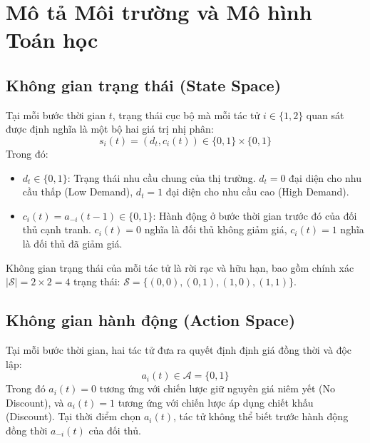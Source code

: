 \documentclass[12pt,a4paper]{article}
\begin{document}
\section{Mô tả Môi trường và Mô hình Toán học}

\subsection{Không gian trạng thái (State Space)}
Tại mỗi bước thời gian $t$, trạng thái cục bộ mà mỗi tác tử $i \in \{1, 2\}$ quan sát được định nghĩa là một bộ hai giá trị nhị phân:
\begin{equation}
s_i(t) = (d_t, c_i(t)) \in \{0, 1\} \times \{0, 1\}
\end{equation}
Trong đó:
\begin{itemize}
    \item $d_t \in \{0, 1\}$: Trạng thái nhu cầu chung của thị trường. $d_t = 0$ đại diện cho nhu cầu thấp (Low Demand), $d_t = 1$ đại diện cho nhu cầu cao (High Demand).
    \item $c_i(t) = a_{-i}(t-1) \in \{0, 1\}$: Hành động ở bước thời gian trước đó của đối thủ cạnh tranh. $c_i(t) = 0$ nghĩa là đối thủ không giảm giá, $c_i(t) = 1$ nghĩa là đối thủ đã giảm giá.
\end{itemize}
Không gian trạng thái của mỗi tác tử là rời rạc và hữu hạn, bao gồm chính xác $|\mathcal{S}| = 2 \times 2 = 4$ trạng thái: $\mathcal{S} = \{(0, 0), (0, 1), (1, 0), (1, 1)\}$.

\subsection{Không gian hành động (Action Space)}
Tại mỗi bước thời gian, hai tác tử đưa ra quyết định định giá đồng thời và độc lập:
\begin{equation}
a_i(t) \in \mathcal{A} = \{0, 1\}
\end{equation}
Trong đó $a_i(t) = 0$ tương ứng với chiến lược giữ nguyên giá niêm yết (No Discount), và $a_i(t) = 1$ tương ứng với chiến lược áp dụng chiết khấu (Discount). Tại thời điểm chọn $a_i(t)$, tác tử không thể biết trước hành động đồng thời $a_{-i}(t)$ của đối thủ.
\end{document}
